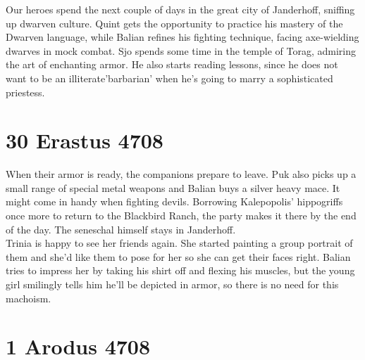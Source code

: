 Our heroes spend the next couple of days in the great city of Janderhoff, sniffing up dwarven culture. Quint gets the opportunity to practice his mastery of the Dwarven language, while Balian refines his fighting technique, facing axe-wielding dwarves in mock combat. Sjo spends some time in the temple of Torag, admiring the art of enchanting armor. He also starts reading lessons, since he does not want to be an illiterate'barbarian' when he's going to marry a sophisticated priestess.\\

\section{30 Erastus 4708}

When their armor is ready, the companions prepare to leave. Puk also picks up a small range of special metal weapons and Balian buys a silver heavy mace. It might come in handy when fighting devils. Borrowing Kalepopolis' hippogriffs once more to return to the Blackbird Ranch, the party makes it there by the end of the day. The seneschal himself stays in Janderhoff.\\

Trinia is happy to see her friends again. She started painting a group portrait of them and she'd like them to pose for her so she can get their faces right. Balian tries to impress her by taking his shirt off and flexing his muscles, but the young girl smilingly tells him he'll be depicted in armor, so there is no need for this machoism.\\

\section{1 Arodus 4708}

